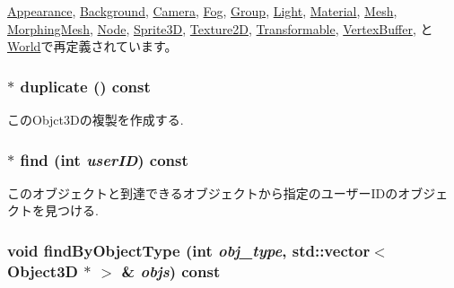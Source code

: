 \hyperlink{classm3g_1_1Appearance_8aad1ceab4c2a03609c8a42324ce484d}{Appearance}, \hyperlink{classm3g_1_1Background_8aad1ceab4c2a03609c8a42324ce484d}{Background}, \hyperlink{classm3g_1_1Camera_8aad1ceab4c2a03609c8a42324ce484d}{Camera}, \hyperlink{classm3g_1_1Fog_8aad1ceab4c2a03609c8a42324ce484d}{Fog}, \hyperlink{classm3g_1_1Group_8aad1ceab4c2a03609c8a42324ce484d}{Group}, \hyperlink{classm3g_1_1Light_8aad1ceab4c2a03609c8a42324ce484d}{Light}, \hyperlink{classm3g_1_1Material_8aad1ceab4c2a03609c8a42324ce484d}{Material}, \hyperlink{classm3g_1_1Mesh_82cfeb67ca66b93e2ca7bda9a4f0e2aa}{Mesh}, \hyperlink{classm3g_1_1MorphingMesh_8aad1ceab4c2a03609c8a42324ce484d}{MorphingMesh}, \hyperlink{classm3g_1_1Node_8aad1ceab4c2a03609c8a42324ce484d}{Node}, \hyperlink{classm3g_1_1Sprite3D_8aad1ceab4c2a03609c8a42324ce484d}{Sprite3D}, \hyperlink{classm3g_1_1Texture2D_82cfeb67ca66b93e2ca7bda9a4f0e2aa}{Texture2D}, \hyperlink{classm3g_1_1Transformable_8aad1ceab4c2a03609c8a42324ce484d}{Transformable}, \hyperlink{classm3g_1_1VertexBuffer_82cfeb67ca66b93e2ca7bda9a4f0e2aa}{VertexBuffer}, と \hyperlink{classm3g_1_1World_8aad1ceab4c2a03609c8a42324ce484d}{World}で再定義されています。\hypertarget{classm3g_1_1Object3D_a25110dac934f867b83b73ad4741a0f4}{
\subsubsection[{duplicate}]{ $\ast$ duplicate () const}}
\label{classm3g_1_1Object3D_a25110dac934f867b83b73ad4741a0f4}


このObjct3Dの複製を作成する. \hypertarget{classm3g_1_1Object3D_aa62f6aaac2e9359875f027ca05788ac}{
\subsubsection[{find}]{ $\ast$ find (int {\em userID}) const}}
\label{classm3g_1_1Object3D_aa62f6aaac2e9359875f027ca05788ac}


このオブジェクトと到達できるオブジェクトから指定のユーザーIDのオブジェクトを見つける. \hypertarget{classm3g_1_1Object3D_4dadb21b568b0230fac106f15040138c}{
\subsubsection[{findByObjectType}]{\setlength{\rightskip}{0pt plus 5cm}void findByObjectType (int {\em obj\_\-type}, \/  std::vector$<$ {\bf Object3D} $\ast$ $>$ \& {\em objs}) const}}
\label{classm3g_1_1Object3D_4dadb21b568b0230fac106f15040138c}


